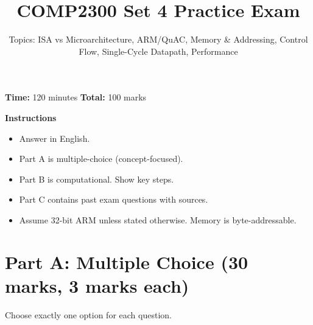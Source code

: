 \documentclass[11pt]{article}
\title{COMP2300 Set 4 Practice Exam}
\author{Topics: ISA vs Microarchitecture, ARM/QuAC, Memory \& Addressing, Control Flow, Single-Cycle Datapath, Performance}
\date{}
\begin{document}
\maketitle

\noindent\textbf{Time:} 120 minutes \hfill
\textbf{Total:} 100 marks

\vspace{0.5em}
\noindent\textbf{Instructions}
\begin{itemize}[leftmargin=1.5em]
  \item Answer in English.
  \item Part A is multiple-choice (concept-focused).
  \item Part B is computational. Show key steps.
  \item Part C contains past exam questions with sources.
  \item Assume 32-bit ARM unless stated otherwise. Memory is byte-addressable.
\end{itemize}

\section*{Part A: Multiple Choice (30 marks, 3 marks each)}
Choose exactly one option for each question.
\end{document}
